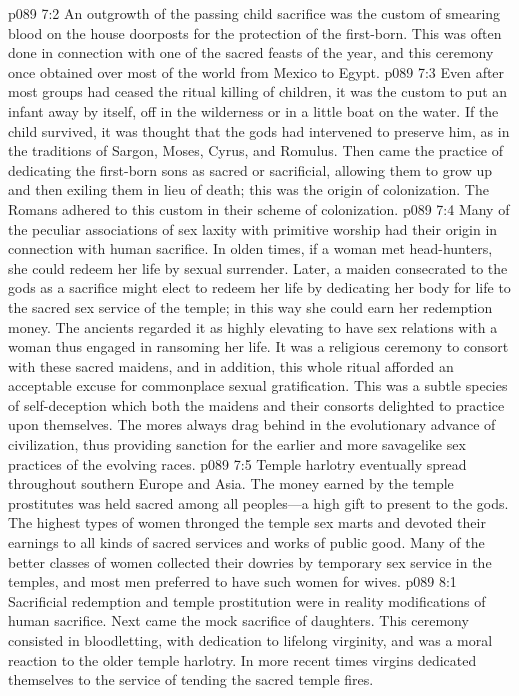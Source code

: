 \vs p089 7:2 An outgrowth of the passing child sacrifice was the custom of smearing blood on the house doorposts for the protection of the first\hyp{}born. This was often done in connection with one of the sacred feasts of the year, and this ceremony once obtained over most of the world from Mexico to Egypt.
\vs p089 7:3 Even after most groups had ceased the ritual killing of children, it was the custom to put an infant away by itself, off in the wilderness or in a little boat on the water. If the child survived, it was thought that the gods had intervened to preserve him, as in the traditions of Sargon, Moses, Cyrus, and Romulus. Then came the practice of dedicating the first\hyp{}born sons as sacred or sacrificial, allowing them to grow up and then exiling them in lieu of death; this was the origin of colonization. The Romans adhered to this custom in their scheme of colonization.
\pc \vs p089 7:4 Many of the peculiar associations of sex laxity with primitive worship had their origin in connection with human sacrifice. In olden times, if a woman met head\hyp{}hunters, she could redeem her life by sexual surrender. Later, a maiden consecrated to the gods as a sacrifice might elect to redeem her life by dedicating her body for life to the sacred sex service of the temple; in this way she could earn her redemption money. The ancients regarded it as highly elevating to have sex relations with a woman thus engaged in ransoming her life. It was a religious ceremony to consort with these sacred maidens, and in addition, this whole ritual afforded an acceptable excuse for commonplace sexual gratification. This was a subtle species of self\hyp{}deception which both the maidens and their consorts delighted to practice upon themselves. The mores always drag behind in the evolutionary advance of civilization, thus providing sanction for the earlier and more savagelike sex practices of the evolving races.\plusone
\vs p089 7:5 \kern-1pt\relax Temple \kern-0.3pt\relax harlotry \kern-0.3pt\relax eventually \kern-0.3pt\relax spread \kern-0.3pt\relax through\-out southern Europe and Asia. The money earned by the temple prostitutes was held sacred among all peoples---a high gift to present to the gods. The highest types of women thronged the temple sex marts and devoted their earnings to all kinds of sacred services and works of public good. Many of the better classes of women collected their dowries by temporary sex service in the temples, and most men preferred to have such women for wives.
\vs p089 8:1 Sacrificial redemption and temple prostitution were in reality modifications of human sacrifice. Next came the mock sacrifice of daughters. This ceremony consisted in bloodletting, with dedication to lifelong virginity, and was a moral reaction to the older temple harlotry. In more recent times virgins dedicated themselves to the service of tending the sacred temple fires.
